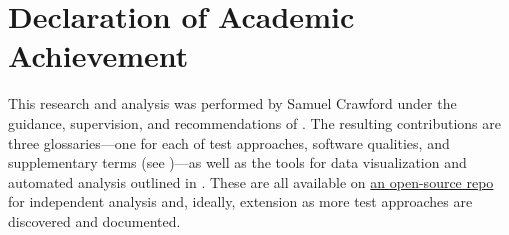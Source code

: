 \chapter{Declaration of Academic Achievement}\label{decl_aca_ach}

This research and analysis was performed by Samuel Crawford under the
guidance, supervision, and recommendations of \supers{}. The resulting
contributions are three glossaries---one for each of test approaches, software
qualities, and supplementary terms (see )---as well as the
tools for data visualization and
automated analysis outlined in . These are all available on
\href{https://github.com/samm82/TestingTesting}{an open-source repo}
for independent analysis and, ideally, extension as more test approaches are
discovered and documented.

